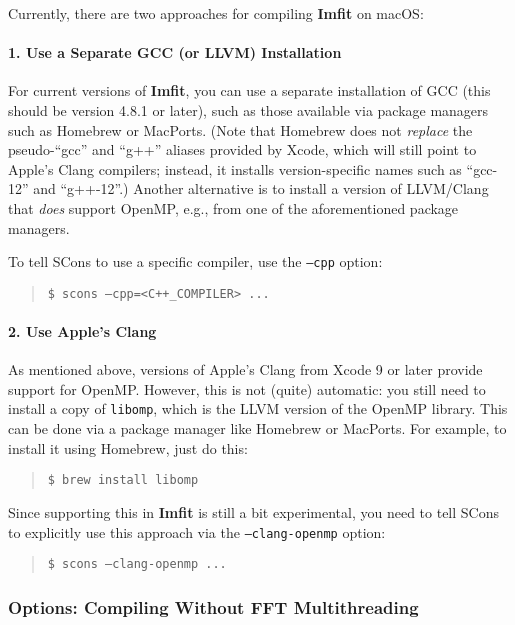 \documentclass[10pt,a4paper,article]{memoir}
\newcommand{\imfit}{\textbf{Imfit}}
\begin{document}
\bigskip

Currently, there are two approaches for compiling \imfit{} on macOS:


\paragraph{1. Use a Separate GCC (or LLVM) Installation}

For current versions of \imfit{}, you can use a separate installation of
GCC (this should be version 4.8.1 or later), such as those available via
package managers such as Homebrew or MacPorts. (Note that Homebrew does
not \textit{replace} the pseudo-``gcc'' and ``g++'' aliases provided by
Xcode, which will still point to Apple's Clang compilers; instead, it
installs version-specific names such as ``gcc-12'' and ``g++-12''.)
Another alternative is to install a version of LLVM/Clang that
\textit{does} support OpenMP, e.g., from one of the aforementioned
package managers.

To tell SCons to use a specific compiler, use the
\texttt{--cpp} option:
\begin{quote}
\texttt{\$ scons --cpp=<C++\_COMPILER> ...}
\end{quote}



\paragraph{2. Use Apple's Clang}

As mentioned above, versions of Apple's Clang from Xcode 9 or later provide
support for OpenMP. However, this is not (quite) automatic: you still
need to install a copy of \texttt{libomp}, which is the LLVM version of
the OpenMP library. This can be done via a package manager like Homebrew
or MacPorts. For example, to install it using Homebrew, just do this:
\begin{quote}
\texttt{\$ brew install libomp}
\end{quote}

Since supporting this in \imfit{} is still a bit experimental, you need
to tell SCons to explicitly use this approach via the \texttt{--clang-openmp}
option:
\begin{quote}
\texttt{\$ scons --clang-openmp ...}
\end{quote}


\subsubsection{Options: Compiling Without FFT Multithreading}
\end{document}
